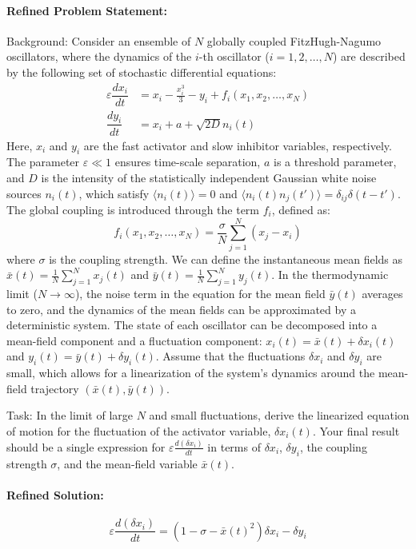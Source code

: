 \documentclass[10pt]{article}
\begin{document}
\paragraph*{Refined Problem Statement:}
Background:
Consider an ensemble of $N$ globally coupled FitzHugh-Nagumo oscillators, where the dynamics of the $i$-th oscillator ($i=1, 2, \ldots, N$) are described by the following set of stochastic differential equations:
\begin{align*}
\varepsilon\dfrac{dx_{i}}{dt} &= x_i - \frac{x_i^3}{3} - y_i + f_i(x_1, x_2, \ldots, x_N) \\
\dfrac{dy_i}{dt} &= x_i + a + \sqrt{2D}n_i(t)
\end{align*}
Here, $x_i$ and $y_i$ are the fast activator and slow inhibitor variables, respectively. The parameter $\varepsilon \ll 1$ ensures time-scale separation, $a$ is a threshold parameter, and $D$ is the intensity of the statistically independent Gaussian white noise sources $n_i(t)$, which satisfy $\langle n_i(t) \rangle = 0$ and $\langle n_i(t)n_j(t') \rangle = \delta_{ij}\delta(t-t')$. The global coupling is introduced through the term $f_i$, defined as:
$$ f_i(x_1, x_2, \ldots, x_N) = \frac{\sigma}{N} \sum_{j=1}^{N}(x_j - x_i) $$
where $\sigma$ is the coupling strength. We can define the instantaneous mean fields as $\bar{x}(t) = \frac{1}{N}\sum_{j=1}^{N}x_j(t)$ and $\bar{y}(t) = \frac{1}{N}\sum_{j=1}^{N}y_j(t)$. In the thermodynamic limit ($N \to \infty$), the noise term in the equation for the mean field $\bar{y}(t)$ averages to zero, and the dynamics of the mean fields can be approximated by a deterministic system. The state of each oscillator can be decomposed into a mean-field component and a fluctuation component: $x_i(t) = \bar{x}(t) + \delta x_i(t)$ and $y_i(t) = \bar{y}(t) + \delta y_i(t)$. Assume that the fluctuations $\delta x_i$ and $\delta y_i$ are small, which allows for a linearization of the system's dynamics around the mean-field trajectory $(\bar{x}(t), \bar{y}(t))$.

Task:
In the limit of large $N$ and small fluctuations, derive the linearized equation of motion for the fluctuation of the activator variable, $\delta x_i(t)$. Your final result should be a single expression for $\varepsilon \frac{d(\delta x_i)}{dt}$ in terms of $\delta x_i$, $\delta y_i$, the coupling strength $\sigma$, and the mean-field variable $\bar{x}(t)$.

\paragraph*{Refined Solution:}
\[ \varepsilon\frac{d(\delta x_i)}{dt} = (1 - \sigma - \bar{x}(t)^2)\delta x_i - \delta y_i \]
\end{document}
